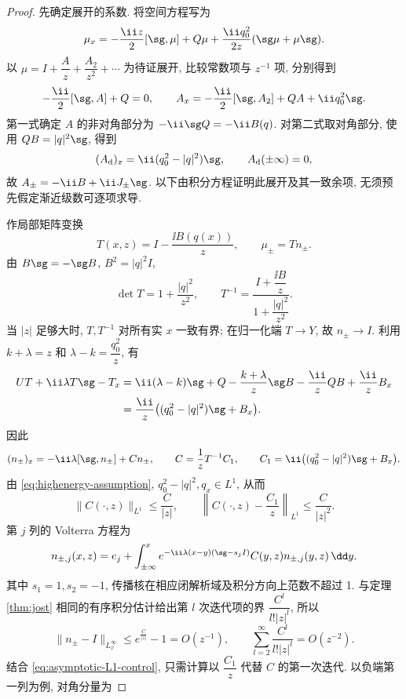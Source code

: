 \begin{proof}
先确定展开的系数. 将空间方程写为
\begin{equation}\label{eq:mu-highenergy-system}
\mu_x=-\dfrac{\ii z}{2}[\sg,\mu]+Q\mu
+\dfrac{\ii q_0^2}{2z}(\sg\mu+\mu\sg).
\end{equation}
以 $\mu=I+\dfrac{A}{z}+\dfrac{A_2}{z^2}+\cdots$ 为待证展开, 比较常数项与 $z^{-1}$ 项, 分别得到
\[
-\dfrac{\ii}{2}[\sg,A]+Q=0,\qquad
A_x=-\dfrac{\ii}{2}[\sg,A_2]+QA+\ii q_0^2\sg.
\]
第一式确定 $A$ 的非对角部分为 $-\ii\sg Q=-\ii B(q)$. 对第二式取对角部分, 使用 $QB=|q|^2\sg$, 得到
\[
(A_{\rm d})_x=\ii(q_0^2-|q|^2)\sg,\qquad
A_{\rm d}(\pm\infty)=0,
\]
故 $A_\pm=-\ii B+\ii J_\pm\sg$. 以下由积分方程证明此展开及其一致余项, 无须预先假定渐近级数可逐项求导.

作局部矩阵变换
\[
 T(x,z)=I-\dfrac{\ii B(q(x))}{z},\qquad \mu_\pm= T n_\pm.
\]
由 $B\sg=-\sg B$, $B^2=|q|^2I$,
\[
\det T=1+\dfrac{|q|^2}{z^2},\qquad
 T^{-1}=\dfrac{I+\dfrac{\ii B}{z}}{1+\dfrac{|q|^2}{z^2}}.
\]
当 $|z|$ 足够大时, $ T, T^{-1}$ 对所有实 $x$ 一致有界; 在归一化端 $ T\to Y$, 故 $n_\pm\to I$. 利用 $k+\lambda=z$ 和 $\lambda-k=\dfrac{q_0^2}{z}$, 有
\begin{align*}
U T+\ii\lambda T\sg- T_x
&=\ii(\lambda-k)\sg+Q-\dfrac{k+\lambda}{z}\sg B
-\dfrac{\ii}{z}QB+\dfrac{\ii}{z}B_x\\
&=\dfrac{\ii}{z}\bigl((q_0^2-|q|^2)\sg+B_x\bigr).
\end{align*}
因此
\begin{equation}\label{eq:n-volterra-system}
(n_\pm)_x=-\ii\lambda[\sg,n_\pm]+ Cn_\pm,\qquad
 C=\dfrac{1}{z} T^{-1} C_1,\qquad
 C_1=\ii\bigl((q_0^2-|q|^2)\sg+B_x\bigr).
\end{equation}
由 \eqref{eq:highenergy-assumption}, $q_0^2-|q|^2,q_x\in L^1$, 从而
\begin{equation}\label{eq:asymptotic-L1-control}
\| C(\cdot,z)\|_{L^1}\le\dfrac{C}{|z|},\qquad
\left\| C(\cdot,z)-\dfrac{ C_1}{z}\right\|_{L^1}
\le\dfrac{C}{|z|^2}.
\end{equation}
第 $j$ 列的 Volterra 方程为
\[
n_{\pm,j}(x,z)=e_j+\int_{\pm\infty}^{x}
e^{-\ii\lambda(x-y)(\sg-s_jI)} C(y,z)n_{\pm,j}(y,z)\,\dd y.
\]
其中 $s_1=1,s_2=-1$, 传播核在相应闭解析域及积分方向上范数不超过 1. 与定理 \ref{thm:jost} 相同的有序积分估计给出第 $l$ 次迭代项的界 $\dfrac{C^l}{l!|z|^l}$, 所以
\[
\|n_\pm-I\|_{L^\infty_x}\le e^{\frac{C}{|z|}}-1=O(z^{-1}),\qquad
\sum\limits_{l=2}^{\infty}\dfrac{C^l}{l!|z|^l}=O(z^{-2}).
\]
结合 \eqref{eq:asymptotic-L1-control}, 只需计算以 $\dfrac{ C_1}{z}$ 代替 $ C$ 的第一次迭代. 以负端第一列为例, 对角分量为

\end{proof}
